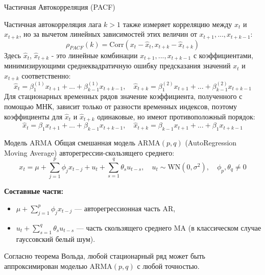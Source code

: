 \begin{frame}{Частичная Автокорреляция (PACF)}

Частичная автокорреляция лага $k > 1$ также измеряет корреляцию между $x_t$ и $x_{t+k}$, но за вычетом линейных зависимостей этих величин от $x_{t+1}, ..., x_{t+k-1}$:
\begin{equation*}
    \rho_{PACF}(k) = \mathrm{Corr}(x_t - \hat{x}_t, x_{t+k} - \hat{x}_{t+k}) 
\end{equation*}
Здесь $\hat{x}_t$, $\hat{x}_{t+k}$ - это линейные комбинации $x_{t+1}, ..., x_{t+k-1}$ с коэффициентами, минимизирующими среднеквадратичную ошибку предсказания значений $x_t$ и $x_{t+k}$ соответственно:
$$ \hat{x}_t = \beta_1^{(1)} x_{t+1} + ... + \beta_{k-1}^{(1)} x_{t+k-1}, \quad \hat{x}_{t+k} = \beta_1^{(2)} x_{t+1} + ... + \beta_{k-1}^{(2)} x_{t+k-1}$$
Для стационарных временных рядов значение коэффициента, полученного с помощью МНК, зависит только от разности временных индексов, поэтому коэффициенты для $\hat{x}_t$ и $\hat{x}_{t+k}$ одинаковые, но имеют противоположный порядок:
$$ \hat{x}_t = \beta_1 x_{t+1} + ... + \beta_{k-1} x_{t+k-1}, \quad \hat{x}_{t+k} = \beta_{k-1} x_{t+1} + ... + \beta_1 x_{t+k-1}$$


\end{frame}

\begin{frame}{Модель ARMA}
Общая смешанная модель ARMA$(p,q)$ (AutoRegression Moving Average) авторегрессии-скользящего среднего:
\begin{equation*}
x_t = \mu + \sum_{j=1}^{p}\phi_j x_{t-j} + u_t + \sum_{s=1}^{q}\theta_s u_{t-s},
\quad u_t \sim \text{WN}(0, \sigma^2),\quad  \phi_p,\theta_q \neq 0
\end{equation*}

\textbf{Составные части:}
\begin{itemize}
    \item $\mu + \sum_{j=1}^{p}\phi_j x_{t-j}$ --- авторегрессионная часть AR,
    \item $u_t + \sum_{s=1}^{q}\theta_s u_{t-s}$ --- часть скользящего среднего MA (в классическом случае гауссовский белый шум).
\end{itemize}
Согласно теорема Вольда, любой стационарный ряд может быть
аппроксимирован моделью ARMA$(p,q)$ с любой точностью.

\end{frame}

